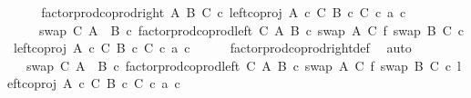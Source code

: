\begin{isabellebody}
\ {\isacharminus}{\kern0pt}\isanewline
\ \ \isamarkupfalse%
\ {\isachardoublequoteopen}factor{\isacharunderscore}{\kern0pt}prod{\isacharunderscore}{\kern0pt}coprod{\isacharunderscore}{\kern0pt}right\ A\ B\ C\ {\isasymcirc}\isactrlsub c\ {\isacharparenleft}{\kern0pt}left{\isacharunderscore}{\kern0pt}coproj\ {\isacharparenleft}{\kern0pt}A\ {\isasymtimes}\isactrlsub c\ C{\isacharparenright}{\kern0pt}\ {\isacharparenleft}{\kern0pt}B\ {\isasymtimes}\isactrlsub c\ C{\isacharparenright}{\kern0pt}\ {\isasymcirc}\isactrlsub c\ {\isasymlangle}a{\isacharcomma}{\kern0pt}\ c{\isasymrangle}{\isacharparenright}{\kern0pt}\isanewline
\ \ \ \ {\isacharequal}{\kern0pt}\ {\isacharparenleft}{\kern0pt}swap\ C\ {\isacharparenleft}{\kern0pt}A\ {\isasymCoprod}\ B{\isacharparenright}{\kern0pt}\ {\isasymcirc}\isactrlsub c\ factor{\isacharunderscore}{\kern0pt}prod{\isacharunderscore}{\kern0pt}coprod{\isacharunderscore}{\kern0pt}left\ C\ A\ B\ {\isasymcirc}\isactrlsub c\ {\isacharparenleft}{\kern0pt}swap\ A\ C\ {\isasymbowtie}\isactrlsub f\ swap\ B\ C{\isacharparenright}{\kern0pt}{\isacharparenright}{\kern0pt}\ {\isasymcirc}\isactrlsub c\ {\isacharparenleft}{\kern0pt}left{\isacharunderscore}{\kern0pt}coproj\ {\isacharparenleft}{\kern0pt}A\ {\isasymtimes}\isactrlsub c\ C{\isacharparenright}{\kern0pt}\ {\isacharparenleft}{\kern0pt}B\ {\isasymtimes}\isactrlsub c\ C{\isacharparenright}{\kern0pt}\ {\isasymcirc}\isactrlsub c\ {\isasymlangle}a{\isacharcomma}{\kern0pt}\ c{\isasymrangle}{\isacharparenright}{\kern0pt}{\isachardoublequoteclose}\isanewline
\ \ \ \ \isamarkupfalse%
\ factor{\isacharunderscore}{\kern0pt}prod{\isacharunderscore}{\kern0pt}coprod{\isacharunderscore}{\kern0pt}right{\isacharunderscore}{\kern0pt}def\ \isamarkupfalse%
\ auto\isanewline
\ \ \isamarkupfalse%
\ \isamarkupfalse%
\ {\isachardoublequoteopen}{\isachardot}{\kern0pt}{\isachardot}{\kern0pt}{\isachardot}{\kern0pt}\ {\isacharequal}{\kern0pt}\ swap\ C\ {\isacharparenleft}{\kern0pt}A\ {\isasymCoprod}\ B{\isacharparenright}{\kern0pt}\ {\isasymcirc}\isactrlsub c\ factor{\isacharunderscore}{\kern0pt}prod{\isacharunderscore}{\kern0pt}coprod{\isacharunderscore}{\kern0pt}left\ C\ A\ B\ {\isasymcirc}\isactrlsub c\ {\isacharparenleft}{\kern0pt}{\isacharparenleft}{\kern0pt}swap\ A\ C\ {\isasymbowtie}\isactrlsub f\ swap\ B\ C{\isacharparenright}{\kern0pt}\ {\isasymcirc}\isactrlsub c\ left{\isacharunderscore}{\kern0pt}coproj\ {\isacharparenleft}{\kern0pt}A\ {\isasymtimes}\isactrlsub c\ C{\isacharparenright}{\kern0pt}\ {\isacharparenleft}{\kern0pt}B\ {\isasymtimes}\isactrlsub c\ C{\isacharparenright}{\kern0pt}{\isacharparenright}{\kern0pt}\ {\isasymcirc}\isactrlsub c\ {\isasymlangle}a{\isacharcomma}{\kern0pt}\ c{\isasymrangle}{\isachardoublequoteclose}\isanewline

\end{isabellebody}
